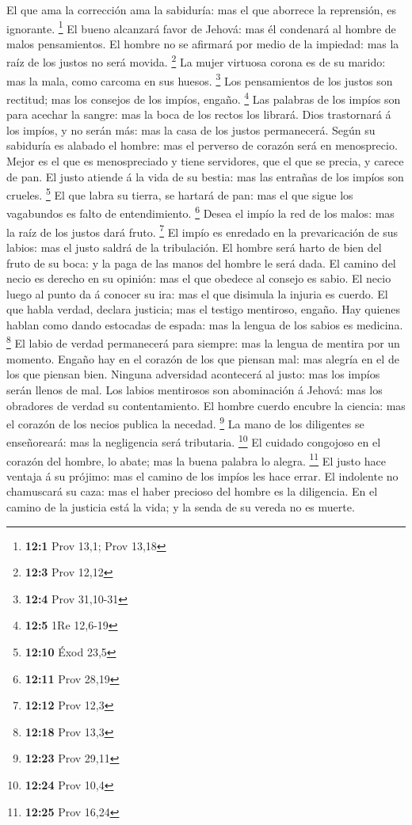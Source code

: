  El que ama la corrección ama la sabiduría: mas el que
aborrece la reprensión, es ignorante. \footnote{\textbf{12:1} Prov 13,1;
  Prov 13,18}  El bueno alcanzará favor de Jehová: mas él
condenará al hombre de malos pensamientos.  El hombre no
se afirmará por medio de la impiedad: mas la raíz de los justos no será
movida. \footnote{\textbf{12:3} Prov 12,12}  La mujer
virtuosa corona es de su marido: mas la mala, como carcoma en sus
huesos. \footnote{\textbf{12:4} Prov 31,10-31}  Los
pensamientos de los justos son rectitud; mas los consejos de los impíos,
engaño. \footnote{\textbf{12:5} 1Re 12,6-19}  Las palabras
de los impíos son para acechar la sangre: mas la boca de los rectos los
librará.  Dios trastornará á los impíos, y no serán más:
mas la casa de los justos permanecerá.  Según su sabiduría
es alabado el hombre: mas el perverso de corazón será en menosprecio.
 Mejor es el que es menospreciado y tiene servidores, que
el que se precia, y carece de pan.  El justo atiende á la
vida de su bestia: mas las entrañas de los impíos son crueles.
\footnote{\textbf{12:10} Éxod 23,5}  El que labra su
tierra, se hartará de pan: mas el que sigue los vagabundos es falto de
entendimiento. \footnote{\textbf{12:11} Prov 28,19} 
Desea el impío la red de los malos: mas la raíz de los justos dará
fruto. \footnote{\textbf{12:12} Prov 12,3}  El impío es
enredado en la prevaricación de sus labios: mas el justo saldrá de la
tribulación.  El hombre será harto de bien del fruto de
su boca: y la paga de las manos del hombre le será dada. 
El camino del necio es derecho en su opinión: mas el que obedece al
consejo es sabio.  El necio luego al punto da á conocer
su ira: mas el que disimula la injuria es cuerdo.  El que
habla verdad, declara justicia; mas el testigo mentiroso, engaño.
 Hay quienes hablan como dando estocadas de espada: mas
la lengua de los sabios es medicina. \footnote{\textbf{12:18} Prov 13,3}
 El labio de verdad permanecerá para siempre: mas la
lengua de mentira por un momento.  Engaño hay en el
corazón de los que piensan mal: mas alegría en el de los que piensan
bien.  Ninguna adversidad acontecerá al justo: mas los
impíos serán llenos de mal.  Los labios mentirosos son
abominación á Jehová: mas los obradores de verdad su contentamiento.
 El hombre cuerdo encubre la ciencia: mas el corazón de
los necios publica la necedad. \footnote{\textbf{12:23} Prov 29,11}
 La mano de los diligentes se enseñoreará: mas la
negligencia será tributaria. \footnote{\textbf{12:24} Prov 10,4}
 El cuidado congojoso en el corazón del hombre, lo abate;
mas la buena palabra lo alegra. \footnote{\textbf{12:25} Prov 16,24}
 El justo hace ventaja á su prójimo: mas el camino de los
impíos les hace errar.  El indolente no chamuscará su
caza: mas el haber precioso del hombre es la diligencia. 
En el camino de la justicia está la vida; y la senda de su vereda no es
muerte.

